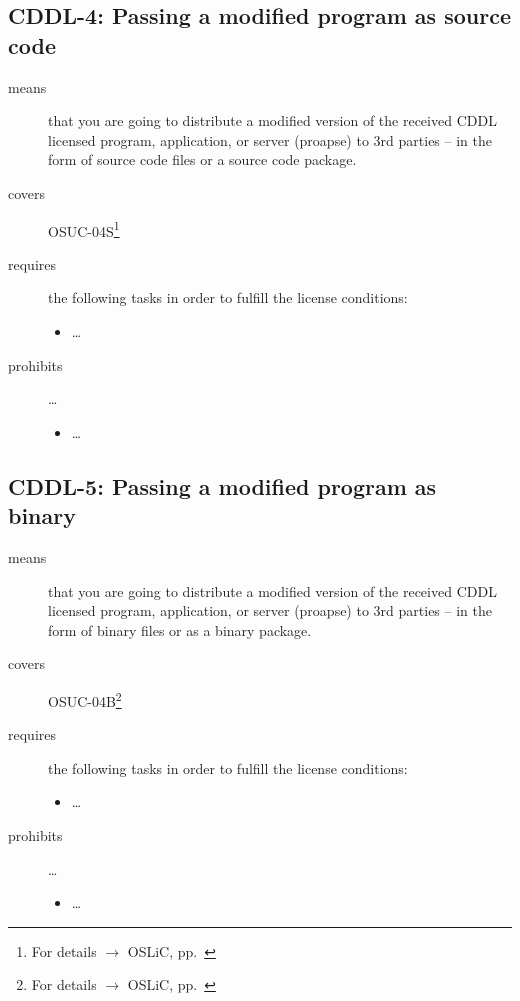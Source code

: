 \subsection{CDDL-4: Passing a modified program as source code}
\label{OSUC-04S-CDDL} 

\begin{description}
\item[means] that you are going to distribute a modified version of the received
CDDL licensed program, application, or server (proapse) to 3rd parties -- in the
form of source code files or a source code package.
\item[covers] OSUC-04S\footnote{For details $\rightarrow$ OSLiC, pp.\
\pageref{OSUC-04S-DEF}}
\item[requires] the following tasks in order to fulfill the license conditions:
\begin{itemize}
  
  \item \ldots
  
\end{itemize}

\item[prohibits] \ldots
\begin{itemize}
  \item \ldots
\end{itemize}
\end{description}

\subsection{CDDL-5: Passing a modified program as binary}
\label{OSUC-04B-CDDL} 

\begin{description}
\item[means] that you are going to distribute a modified version of the received
CDDL licensed pro\-gram, application, or server (proapse) to 3rd parties -- in
the form of binary files or as a binary package.
\item[covers] OSUC-04B\footnote{For details $\rightarrow$ OSLiC, pp.\
\pageref{OSUC-04B-DEF}}
\item[requires] the following tasks in order to fulfill the license conditions:
\begin{itemize}
  
  \item \ldots
  
\end{itemize}

\item[prohibits] \ldots
\begin{itemize}
  \item \ldots
\end{itemize}
\end{description}


